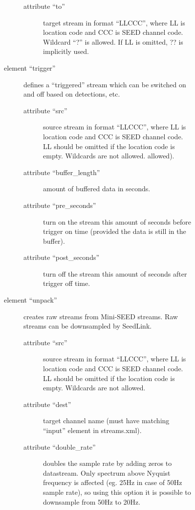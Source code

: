 \documentclass[11pt,a4paper,titlepage]{article}
\begin{document}
\begin{description}
\begin{description}
\begin{description}
\begin{description}
\begin{description}
\item[attribute ``to''] target stream in format ``LLCCC'', where LL is
location code and CCC is SEED channel code. Wildcard ``?'' is allowed. If
LL is omitted, ?? is implicitly used.
\end{description}

\item[element ``trigger''] defines a ``triggered'' stream which can be
switched on and off based on detections, etc.

\begin{description}
\item[attribute ``src''] source stream in format ``LLCCC'', where LL is
location code and CCC is SEED channel code. LL should be omitted if the
location code is empty. Wildcards are not allowed.
allowed).

\item[attribute ``buffer\_length'' ] amount of buffered data in
seconds.

\item[attribute ``pre\_seconds'' ] turn on the stream this amount
of seconds before trigger on time (provided the data is still in the
buffer).

\item[attribute ``post\_seconds'' ] turn off the stream this amount
of seconds after trigger off time.
\end{description}

\item[element ``unpack''] creates raw streams from Mini-SEED streams. Raw
streams can be downsampled by SeedLink.

\begin{description}
\item[attribute ``src''] source stream in format ``LLCCC'', where LL is
location code and CCC is SEED channel code. LL should be omitted if the
location code is empty. Wildcards are not allowed.

\item[attribute ``dest''] target channel name (must have matching ``input''
element in streams.xml).

\item[attribute ``double\_rate'' ] doubles the sample rate by
adding zeros to datastream. Only spectrum above Nyquist frequency is
affected (eg. 25Hz in case of 50Hz sample rate), so using this option it is
possible to downsample from 50Hz to 20Hz.
\end{description}

\end{description}

\end{description}

\end{description}

\end{description}
\end{document}
